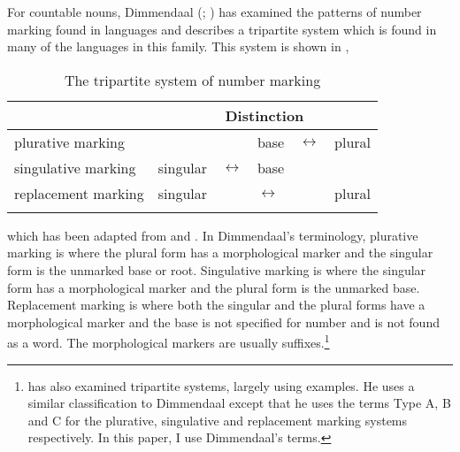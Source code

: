 \documentclass[output=paper]{langsci/langscibook}
\begin{document}
\largerpage[2]
For countable nouns, Dimmendaal (\citeyear[224]{Dimmendaal1983}; \citeyear[214]{Dimmendaal2000}) has examined the patterns of number marking found in  languages and describes a tripartite system which is found in many of the languages in this family. This system is shown in ,
\begin{table} 
\begin{tabular}{llllll}
\lsptoprule
\multicolumn{1}{c}{{System}} & \multicolumn{5}{c}{{Distinction}}\\
\midrule
plurative marking &  &  & base & $\longleftrightarrow$ & plural\\
singulative marking & singular & $\longleftrightarrow$ & base &  & \\
replacement marking & singular &  & $\longleftrightarrow$ &  & plural\\
\lspbottomrule
\end{tabular}
\caption{The tripartite system of number marking}
\label{tab:moodie:1}
\end{table}
\clearpage \noindent
which has been adapted from \citet[224]{Dimmendaal1983} and \citet[156]{Corbett2000}. In Dimmendaal’s terminology, plurative marking is where the plural form has a morphological marker and the singular form is the unmarked base or root. Singulative marking is where the singular form has a morphological marker and the plural form is the unmarked base. Replacement marking is where both the singular and the plural forms have a morphological marker and the base is not specified for number and is not found as a word. The morphological markers are usually suffixes.\footnote{\citet[156]{Corbett2000} has also examined tripartite systems, largely using  examples. He uses a similar classification to Dimmendaal except that he uses the terms Type A, B and C for the plurative, singulative and replacement marking systems respectively. In this paper, I use Dimmendaal’s terms.}
\end{document}
